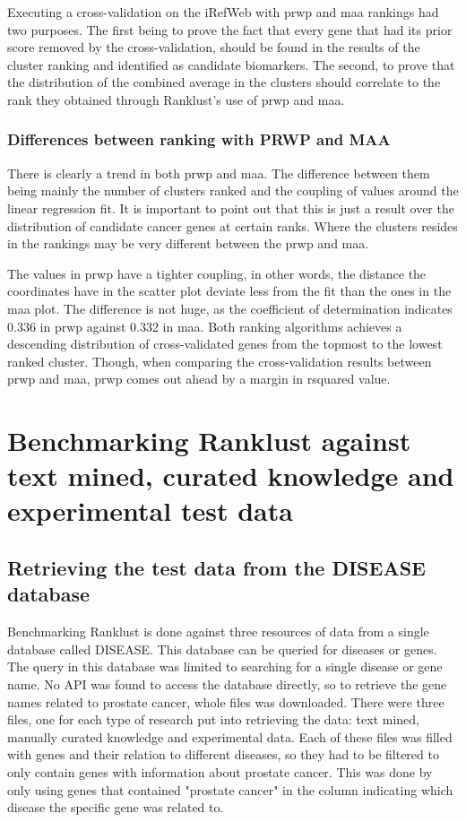 Executing a cross-validation on the iRefWeb with \gls{prwp} and \gls{maa}
rankings had two purposes. The first being to prove the fact that every gene
that had its prior score removed by the cross-validation, should be found in the
results of the cluster ranking and identified as candidate biomarkers. The
second, to prove that the distribution of the combined average in the clusters
should correlate to the rank they obtained through Ranklust's use of \gls{prwp}
and \gls{maa}.

\subsection{Differences between ranking with PRWP and MAA}
There is clearly a trend in both \gls{prwp} and \gls{maa}. The difference
between them being mainly the number of clusters ranked and the coupling of
values around the linear regression fit. It is important to point out that this
is just a result over the distribution of candidate cancer genes at certain
ranks. Where the clusters resides in the rankings may be very different between
the \gls{prwp} and \gls{maa}.

The values in \gls{prwp} have a tighter coupling, in other words, the distance
the coordinates have in the scatter plot deviate less from the fit than the ones
in the \gls{maa} plot. The difference is not huge, as the coefficient of
determination indicates 0.336 in \gls{prwp} against 0.332 in \gls{maa}. Both
ranking algorithms achieves a descending distribution of cross-validated genes
from the topmost to the lowest ranked cluster. Though, when comparing the
cross-validation results between \gls{prwp} and \gls{maa}, \gls{prwp} comes out
ahead by a margin in \gls{rsquared} value.

\chapter{Benchmarking Ranklust against text mined, curated knowledge and experimental test data}
\section{Retrieving the test data from the DISEASE database}
Benchmarking Ranklust is done against three resources of data from a single
database called DISEASE\cite{jensen}. This database can be queried for diseases
or genes. The query in this database was limited to searching for a single
disease or gene name. No API was found to access the database directly, so to
retrieve the gene names related to prostate cancer, whole files was downloaded.
There were three files, one for each type of research put into retrieving the
data: text mined, manually curated knowledge and experimental data. Each of
these files was filled with genes and their relation to different diseases, so
they had to be filtered to only contain genes with information about prostate
cancer. This was done by only using genes that contained "prostate cancer" in
the column indicating which disease the specific gene was related to.

